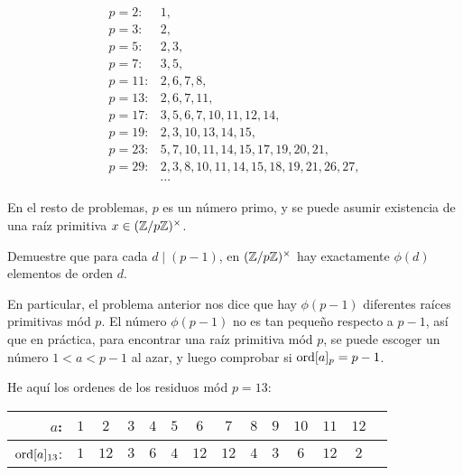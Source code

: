 \documentclass{article}
\begin{document}
\begin{align*}
  p = 2\colon & 1, \\
  p = 3\colon & 2, \\
  p = 5\colon & 2, 3, \\
  p = 7\colon & 3, 5, \\
  p = 11\colon & 2, 6, 7, 8, \\
  p = 13\colon & 2, 6, 7, 11, \\
  p = 17\colon & 3, 5, 6, 7, 10, 11, 12, 14, \\
  p = 19\colon & 2, 3, 10, 13, 14, 15, \\
  p = 23\colon & 5, 7, 10, 11, 14, 15, 17, 19, 20, 21, \\
  p = 29\colon & 2, 3, 8, 10, 11, 14, 15, 18, 19, 21, 26, 27, \\
              & \cdots
\end{align*}

En el resto de problemas, $p$ es un número primo, y se puede asumir existencia
de una raíz primitiva $x \in (\mathbb{Z}/p\mathbb{Z})^\times$.

\begin{problema}
  Demuestre que para cada $d \mid (p-1)$, en $(\mathbb{Z}/p\mathbb{Z})^\times$ hay exactamente
  $\phi(d)$ elementos de orden $d$.
\end{problema}

\begin{comentario}
  En particular, el problema anterior nos dice que hay $\phi (p-1)$ diferentes
  raíces primitivas mód $p$. El número $\phi (p-1)$ no es tan pequeño respecto a
  $p-1$, así que en práctica, para encontrar una raíz primitiva mód $p$,
  se puede escoger un número $1 < a < p-1$ al azar, y luego comprobar si
  $\operatorname{ord} [a]_p = p-1$.
\end{comentario}

\begin{ejemplo}
  He aquí los ordenes de los residuos mód $p = 13$:

  \begin{center}
    \begin{tabular}{rccccccccccccc}
      \hline
      $a$: & $1$ & $2$ & $3$ & $4$ & $5$ & $6$ & $7$ & $8$ & $9$ & $10$ & $11$ & $12$ \\
      \hline
      $\operatorname{ord} [a]_{13}$: & $1$ & $12$ & $3$ & $6$ & $4$ & $12$ & $12$ & $4$ & $3$ & $6$ & $12$ & $2$ \\
      \hline
    \end{tabular}
  \end{center}
\end{ejemplo}
\end{document}
